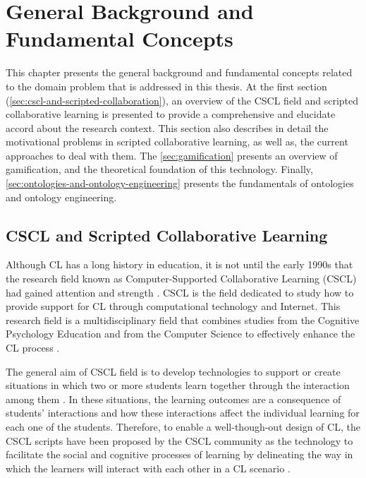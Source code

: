 
\chapter{General Background and Fundamental Concepts}
\label{chapter:general-background}

This chapter presents the general background and fundamental concepts related to the domain problem that is addressed in this thesis.
At the first section (\autoref{sec:cscl-and-scripted-collaboration}), an overview of the CSCL field and scripted collaborative learning is presented to provide a comprehensive and elucidate accord about the research context.
This section also describes in detail the motivational problems in scripted collaborative learning, as well as, the current approaches to deal with them.
The \autoref{sec:gamification} presents an overview of gamification, and the theoretical foundation of this technology.
Finally, \autoref{sec:ontologies-and-ontology-engineering} presents the fundamentals of ontologies and ontology engineering.


\section{CSCL and Scripted Collaborative Learning}
\label{sec:cscl-and-scripted-collaboration}

Although CL has a long history in education, it is not until the early 1990s that the research field known as Computer-Supported Collaborative Learning (CSCL) had gained attention and strength \cite{StahlKoschmannSuthers2006}.
CSCL is the field dedicated to study how to provide support for CL through computational technology and Internet.
This research field is a multidisciplinary field that combines studies from the Cognitive Psychology Education and from the Computer Science to effectively enhance the CL process \cite{HoppeOgataSoller2007}.

The general aim of CSCL field is to develop technologies to support or create situations in which two or more students learn together through the interaction among them \cite{Dillenbourg1999}.
In these situations, the learning outcomes are a consequence of students' interactions and how these interactions affect the individual learning for each one of the students.
Therefore, to enable a well-though-out design of CL, the CSCL scripts have been proposed by the CSCL community as the technology to facilitate the social and cognitive processes of learning by delineating the way in which the learners will interact with each other in a CL scenario \cite{HarrerKobbeMalzahn2007}.

